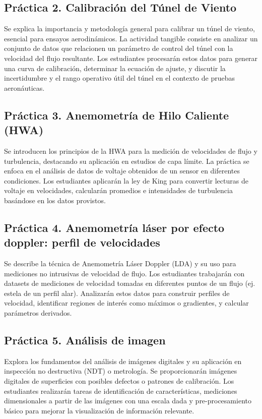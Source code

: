\documentclass[11pt, a4paper]{article}
\begin{document}
\subsection{Práctica 2. Calibración del Túnel de Viento}
Se explica la importancia y metodología general para calibrar un túnel de viento, esencial para ensayos aerodinámicos. La actividad tangible consiste en analizar un conjunto de datos que relacionen un parámetro de control del túnel con la velocidad del flujo resultante. Los estudiantes procesarán estos datos para generar una curva de calibración, determinar la ecuación de ajuste, y discutir la incertidumbre y el rango operativo útil del túnel en el contexto de pruebas aeronáuticas.

\subsection{Práctica 3. Anemometría de Hilo Caliente (HWA)}
Se introducen los principios de la HWA para la medición de velocidades de flujo y turbulencia, destacando su aplicación en estudios de capa límite. La práctica se enfoca en el análisis de datos de voltaje obtenidos de un sensor en diferentes condiciones. Los estudiantes aplicarán la ley de King para convertir lecturas de voltaje en velocidades, calcularán promedios e intensidades de turbulencia basándose en los datos provistos.

\subsection{Práctica 4. Anemometría láser por efecto doppler: perfil de velocidades}
Se describe la técnica de Anemometría Láser Doppler (LDA) y su uso para mediciones no intrusivas de velocidad de flujo. Los estudiantes trabajarán con datasets de mediciones de velocidad tomadas en diferentes puntos de un flujo (ej. estela de un perfil alar). Analizarán estos datos para construir perfiles de velocidad, identificar regiones de interés como máximos o gradientes, y calcular parámetros derivados.

\subsection{Práctica 5. Análisis de imagen}
Explora los fundamentos del análisis de imágenes digitales y su aplicación en inspección no destructiva (NDT) o metrología. Se proporcionarán imágenes digitales de superficies con posibles defectos o patrones de calibración. Los estudiantes realizarán tareas de identificación de características, mediciones dimensionales a partir de las imágenes con una escala dada y pre-procesamiento básico para mejorar la visualización de información relevante.
\end{document}
